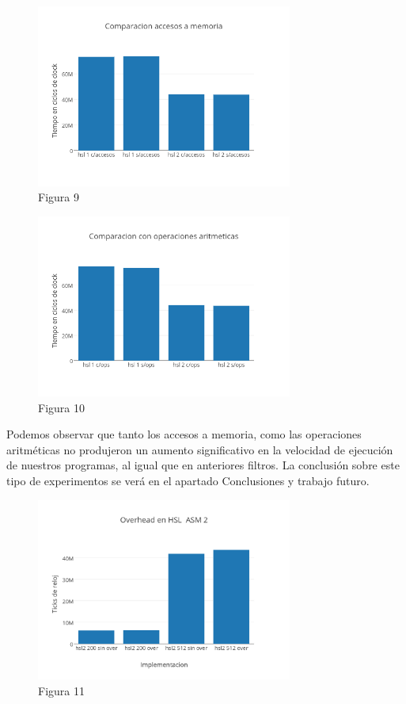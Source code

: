 \documentclass[a4paper]{article}
\begin{document}
\begin{figure}[h]
  \centering
    \includegraphics[width=0.75\textwidth]{imagenes/Comparacion accesos a memoria hsl colores.png}
  \caption{Figura 9}
  \label{fig:graficohsl3}
\end{figure}
 \FloatBarrier

\begin{figure}[h]
  \centering
    \includegraphics[width=0.75\textwidth]{imagenes/Comparacion con operaciones aritmeticas hsl colores.png}
  \caption{Figura 10}
  \label{fig:graficohsl4}
\end{figure}
 \FloatBarrier

Podemos observar que tanto los accesos a memoria, como las operaciones aritméticas no produjeron un aumento significativo en la velocidad de ejecución de nuestros programas, al igual que en anteriores filtros. La conclusión sobre este tipo de experimentos se verá en el apartado Conclusiones y trabajo futuro.

\begin{figure}[h]
  \centering
    \includegraphics[width=0.75\textwidth]{imagenes/OverheadEnHSLASM2.png}
  \caption{Figura 11}
  \label{fig:graficohsl5}
\end{figure}
 \FloatBarrier
\end{document}
